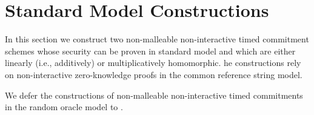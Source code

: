 \section{Standard Model Constructions}
In this section we construct two non-malleable non-interactive timed commitment schemes whose security can be proven in standard model and which are either linearly (i.e., additively) or multiplicatively homomorphic.  he constructions rely on non-interactive zero-knowledge proofs in the common reference string model. 




We defer the constructions of non-malleable non-interactive timed commitments in the random oracle model to .


